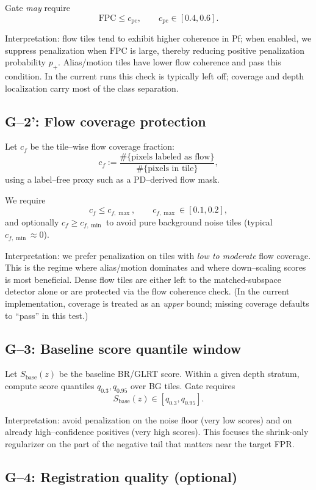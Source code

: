 \documentclass[11pt]{article}
\begin{document}
Gate \emph{may} require
\[
\mathrm{FPC}\le c_{\text{pc}},\qquad c_{\text{pc}}\in[0.4,0.6].
\]

Interpretation: flow tiles tend to exhibit higher coherence in Pf; when enabled, we suppress penalization when $\mathrm{FPC}$ is large, thereby reducing positive penalization probability $p_+$. Alias/motion tiles have lower flow coherence and pass this condition. In the current runs this check is typically left off; coverage and depth localization carry most of the class separation.

\subsection{G--2': Flow coverage protection}

Let $c_f$ be the tile--wise flow coverage fraction:
\[
c_f := \frac{\#\{\text{pixels labeled as flow}\}}{\#\{\text{pixels in tile}\}},
\]
using a label--free proxy such as a PD--derived flow mask.

We require
\[
c_f \le c_{f,\max},\qquad c_{f,\max}\in[0.1,0.2],
\]
and optionally $c_f \ge c_{f,\min}$ to avoid pure background noise tiles (typical $c_{f,\min}\approx 0$).

Interpretation: we prefer penalization on tiles with \emph{low to moderate} flow coverage. This is the regime where alias/motion dominates and where down--scaling scores is most beneficial. Dense flow tiles are either left to the matched-subspace detector alone or are protected via the flow coherence check. (In the current implementation, coverage is treated as an \emph{upper} bound; missing coverage defaults to ``pass'' in this test.)

\subsection{G--3: Baseline score quantile window}

Let $S_{\text{base}}(z)$ be the baseline BR/GLRT score. Within a given depth stratum, compute score quantiles $q_{0.3},q_{0.95}$ over BG tiles. Gate requires
\[
S_{\text{base}}(z)\in [q_{0.3},q_{0.95}].
\]

Interpretation: avoid penalization on the noise floor (very low scores) and on already high--confidence positives (very high scores). This focuses the shrink-only regularizer on the part of the negative tail that matters near the target FPR.

\subsection{G--4: Registration quality (optional)}
\end{document}
